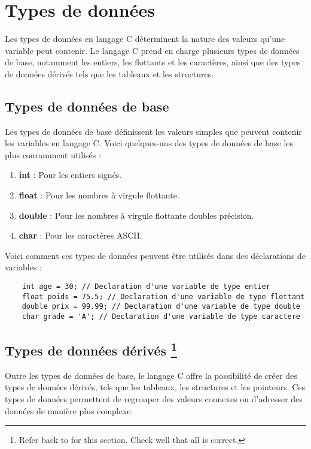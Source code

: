 \section{Types de données}

Les types de données en langage C déterminent la nature des valeurs qu'une variable peut contenir. Le langage C prend en charge plusieurs types de données de base, notamment les entiers, les flottants et les caractères, ainsi que des types de données dérivés tels que les tableaux et les structures.

\subsection{Types de données de base}

Les types de données de base définissent les valeurs simples que peuvent contenir les variables en langage C. Voici quelques-uns des types de données de base les plus couramment utilisés :

\begin{enumerate}[label=\alph*)]
	\item \textbf{int} : Pour les entiers signés.
	\item \textbf{float} : Pour les nombres à virgule flottante.
	\item \textbf{double} : Pour les nombres à virgule flottante doubles précision.
	\item \textbf{char} : Pour les caractères ASCII.
\end{enumerate}

Voici comment ces types de données peuvent être utilisés dans des déclarations de variables :

\begin{lstlisting}
	int age = 30; // Declaration d'une variable de type entier
	float poids = 75.5; // Declaration d'une variable de type flottant
	double prix = 99.99; // Declaration d'une variable de type double
	char grade = 'A'; // Declaration d'une variable de type caractere
\end{lstlisting}

\subsection{Types de données dérivés \footnote{Refer back to \cite{narasimha2017data} for this section. Check well that all is correct.}}

Outre les types de données de base, le langage C offre la possibilité de créer des types de données dérivés, tels que les tableaux, les structures et les pointeurs. Ces types de données permettent de regrouper des valeurs connexes ou d'adresser des données de manière plus complexe.

